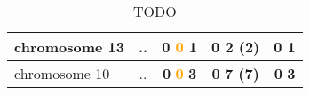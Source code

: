 \begin{table}[H]
\begin{tabular}{||l|c|c|c|c||}
\hline
chromosome 13&..&\textcolor{vert}{\textbf{0}} \textcolor{orange}{\textbf{0}} \textcolor{rose}{\textbf{1}} &\textcolor{vert}{\textbf{0}} \textcolor{rose}{\textbf{2 (2)}} &\textcolor{vert}{\textbf{0}} \textcolor{rose}{\textbf{1}} \\
\hline
chromosome 10&..&\textcolor{vert}{\textbf{0}} \textcolor{orange}{\textbf{0}} \textcolor{rose}{\textbf{3}} &\textcolor{vert}{\textbf{0}} \textcolor{rose}{\textbf{7 (7)}} &\textcolor{vert}{\textbf{0}} \textcolor{rose}{\textbf{3}} \\
\hline
\hline
		\end{tabular}
	\caption{TODO}
	\label{tab:TODO}
\end{table}